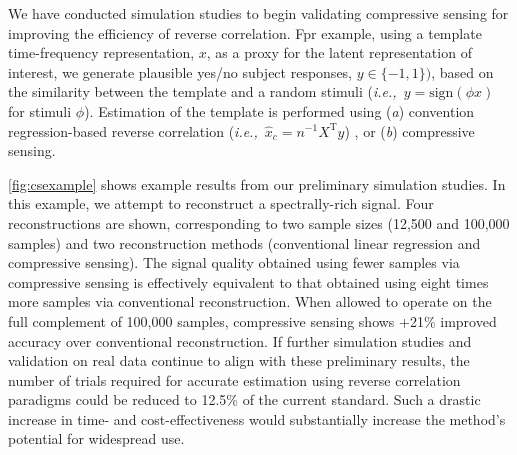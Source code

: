 \documentclass[11pt, notitlepage]{article} %
\def\ie{{\emph{i.e.,}}~}
\begin{document}
We have conducted simulation studies to begin validating compressive sensing
for improving the efficiency of reverse correlation.
Fpr example, using a template time-frequency representation, $x$,
as a proxy for the latent representation of interest,
we generate plausible yes/no subject responses, $y \in \{-1, 1\})$,
based on the similarity between the template
and a random stimuli (\ie $y = \mathrm{sign}(\phi x)$ for stimuli $\phi$).
Estimation of the template is performed using
(\emph{a}) convention regression-based reverse correlation
(\ie $\hat{x}_c = n^{-1} X^\mathrm{T}y$) \cite{gosselinSuperstitiousPerceptionsReveal2003},
or (\emph{b}) compressive sensing.

\autoref{fig:csexample} shows example results from our preliminary simulation studies.
In this example, we attempt to reconstruct a spectrally-rich signal.
Four reconstructions are shown, corresponding to two sample sizes (12,500 and 100,000 samples)
and two reconstruction methods (conventional linear regression and compressive sensing).
The signal quality obtained using fewer samples via compressive sensing
is effectively equivalent to that obtained using eight times more samples
via conventional reconstruction.
When allowed to operate on the full complement of 100,000 samples,
compressive sensing shows +21\% improved accuracy over conventional reconstruction.
If further simulation studies and validation on real data continue to align with these preliminary results,
the number of trials required for accurate estimation using reverse correlation paradigms
could be reduced to 12.5\% of the current standard.
Such a drastic increase in time- and cost-effectiveness would substantially
increase the method's potential for widespread use.
\end{document}
